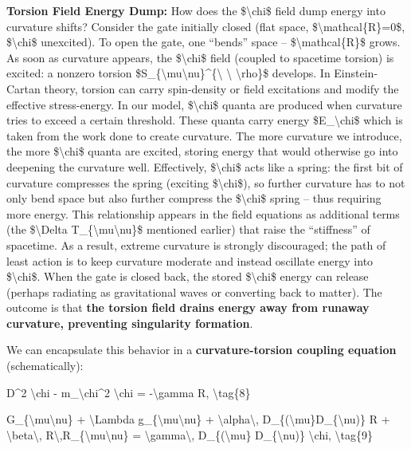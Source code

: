 \documentclass[]{article}
\begin{document}
\textbf{Torsion Field Energy Dump:} How does the \$\textbackslash{}chi\$
field dump energy into curvature shifts? Consider the gate initially
closed (flat space, \$\textbackslash{}mathcal\{R\}=0\$,
\$\textbackslash{}chi\$ unexcited). To open the gate, one ``bends''
space -- \$\textbackslash{}mathcal\{R\}\$ grows. As soon as curvature
appears, the \$\textbackslash{}chi\$ field (coupled to spacetime
torsion) is excited: a nonzero torsion
\$S\_\{\textbackslash{}mu\textbackslash{}nu\}\^{}\{\textbackslash{}
\textbackslash{} \textbackslash{}rho\}\$ develops. In Einstein-Cartan
theory, torsion can carry spin-density or field excitations and modify
the effective stress-energy. In our model, \$\textbackslash{}chi\$
quanta are produced when curvature tries to exceed a certain threshold.
These quanta carry energy \$E\_\textbackslash{}chi\$ which is taken from
the work done to create curvature. The more curvature we introduce, the
more \$\textbackslash{}chi\$ quanta are excited, storing energy that
would otherwise go into deepening the curvature well. Effectively,
\$\textbackslash{}chi\$ acts like a spring: the first bit of curvature
compresses the spring (exciting \$\textbackslash{}chi\$), so further
curvature has to not only bend space but also further compress the
\$\textbackslash{}chi\$ spring -- thus requiring more energy. This
relationship appears in the field equations as additional terms (the
\$\textbackslash{}Delta T\_\{\textbackslash{}mu\textbackslash{}nu\}\$
mentioned earlier) that raise the ``stiffness'' of spacetime. As a
result, extreme curvature is strongly discouraged; the path of least
action is to keep curvature moderate and instead oscillate energy into
\$\textbackslash{}chi\$. When the gate is closed back, the stored
\$\textbackslash{}chi\$ energy can release (perhaps radiating as
gravitational waves or converting back to matter). The outcome is that
\textbf{the torsion field drains energy away from runaway curvature,
preventing singularity formation}.

We can encapsulate this behavior in a \textbf{curvature-torsion coupling
equation} (schematically):

D\^{}2 \textbackslash{}chi - m\_\textbackslash{}chi\^{}2
\textbackslash{}chi = -\textbackslash{}gamma R, \textbackslash{}tag\{8\}

G\_\{\textbackslash{}mu\textbackslash{}nu\} + \textbackslash{}Lambda
g\_\{\textbackslash{}mu\textbackslash{}nu\} +
\textbackslash{}alpha\textbackslash{},
D\_\{(\textbackslash{}mu\}D\_\{\textbackslash{}nu)\} R +
\textbackslash{}beta\textbackslash{},
R\textbackslash{},R\_\{\textbackslash{}mu\textbackslash{}nu\} =
\textbackslash{}gamma\textbackslash{}, D\_\{(\textbackslash{}mu\}
D\_\{\textbackslash{}nu)\} \textbackslash{}chi, \textbackslash{}tag\{9\}
\end{document}
